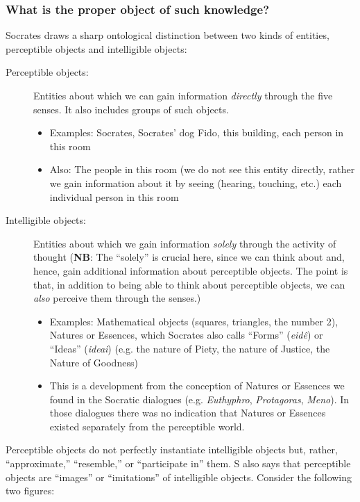 \documentclass[oneside]{article}
\begin{document}
\subsubsection*{What is the proper object of such knowledge?}

Socrates draws a sharp ontological distinction between two kinds of entities, perceptible objects and intelligible objects:

\begin{description}
\item[Perceptible objects:] Entities about which we can gain information \emph{directly} through the five senses. It also includes groups of such objects.
\begin{itemize}\item{Examples: Socrates, Socrates' dog Fido, this building, each person in this room}\item{Also: The people in this room (we do not see this entity directly, rather we gain information about it by seeing (hearing, touching, etc.) each individual person in this room}\end{itemize}

\item[Intelligible objects:] Entities about which we gain information \emph{solely} through the activity of thought (\textbf{NB}: The ``solely'' is crucial here, since we can think about and, hence, gain additional information about perceptible objects. The point is that, in addition to being able to think about perceptible objects, we can \emph{also} perceive them through the senses.)

\begin{itemize}\item{Examples: Mathematical objects (squares, triangles, the number 2), Natures or Essences, which Socrates also calls ``Forms'' (\emph{eid\^{e}}) or ``Ideas'' (\emph{ideai}) (e.g. the nature of Piety, the nature of Justice, the Nature of Goodness)}\item{This is a development from the conception of Natures or Essences we found in the Socratic dialogues (e.g. \emph{Euthyphro}, \emph{Protagoras}, \emph{Meno}). In those dialogues there was no indication that Natures or Essences existed separately from the perceptible world.}\end{itemize}

\end{description}
Perceptible objects do not perfectly instantiate intelligible objects but, rather, ``approximate,'' ``resemble,'' or ``participate in'' them. S also says that perceptible objects are ``images'' or ``imitations'' of intelligible objects. Consider the following two figures:
\end{document}
